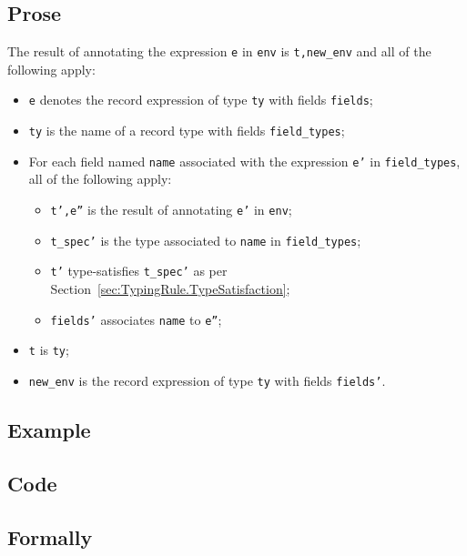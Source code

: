 \documentclass{book}
\begin{document}
  \subsection{Prose}
  The result of annotating the expression \texttt{e} in \texttt{env} is
\texttt{t,new\_env} and all of the following apply:
  \begin{itemize}
  \item \texttt{e} denotes the record expression of type \texttt{ty} with fields \texttt{fields};
  \item \texttt{ty} is the name of a record type with fields \texttt{field\_types};
  \item For each field named \texttt{name} associated with the expression \texttt{e'} in
    \texttt{field\_types}, all of the following apply:
    \begin{itemize}
    \item \texttt{t',e''} is the result of annotating \texttt{e'} in \texttt{env};
    \item \texttt{t\_spec'} is the type associated to \texttt{name} in \texttt{field\_types};
    \item \texttt{t'} type-satisfies \texttt{t\_spec'} as per Section~\ref{sec:TypingRule.TypeSatisfaction};
    \item \texttt{fields'} associates \texttt{name} to \texttt{e''};
    \end{itemize}
  \item \texttt{t} is \texttt{ty};
  \item \texttt{new\_env} is the record expression of type \texttt{ty} with fields \texttt{fields'}.
  \end{itemize}

  \subsection{Example}

  \subsection{Code}

\begin{emptyformal}
    \subsection{Formally}
\end{emptyformal}
\end{document}
